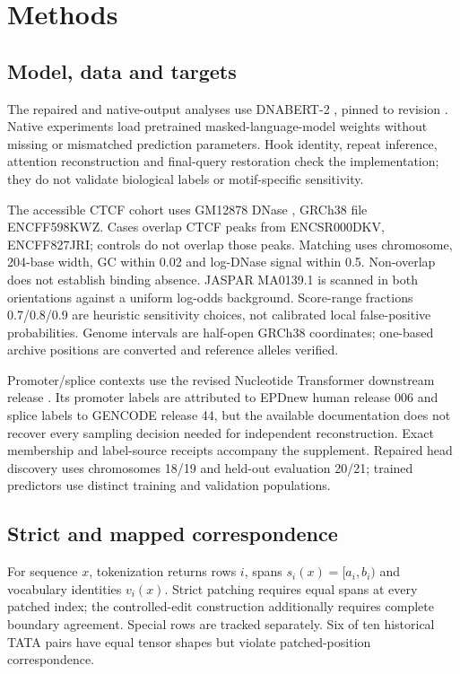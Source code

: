 \documentclass[unnumsec,webpdf,modern,large,namedate]{oup-authoring-template}
\begin{document}
\section{Methods}
\subsection{Model, data and targets}
The repaired and native-output analyses use DNABERT-2 \citep{zhou2024dnabert2}, pinned to revision . Native experiments load pretrained masked-language-model weights without missing or mismatched prediction parameters. Hook identity, repeat inference, attention reconstruction and final-query restoration check the implementation; they do not validate biological labels or motif-specific sensitivity.

The accessible CTCF cohort uses GM12878 DNase , GRCh38 file ENCFF598KWZ. Cases overlap CTCF peaks from ENCSR000DKV, ENCFF827JRI; controls do not overlap those peaks. Matching uses chromosome, 204-base width, GC within 0.02 and log-DNase signal within 0.5. Non-overlap does not establish binding absence. JASPAR MA0139.1 is scanned in both orientations against a uniform log-odds background. Score-range fractions 0.7/0.8/0.9 are heuristic sensitivity choices, not calibrated local false-positive probabilities. Genome intervals are half-open GRCh38 coordinates; one-based archive positions are converted and reference alleles verified.

Promoter/splice contexts use the revised Nucleotide Transformer downstream release . Its promoter labels are attributed to EPDnew human release 006 and splice labels to GENCODE release 44, but the available documentation does not recover every sampling decision needed for independent reconstruction. Exact membership and label-source receipts accompany the supplement. Repaired head discovery uses chromosomes 18/19 and held-out evaluation 20/21; trained predictors use distinct training and validation populations.
\subsection{Strict and mapped correspondence}
For sequence $x$, tokenization returns rows $i$, spans $s_i(x)=[a_i,b_i)$ and vocabulary identities $v_i(x)$. Strict patching requires equal spans at every patched index; the controlled-edit construction additionally requires complete boundary agreement. Special rows are tracked separately. Six of ten historical TATA pairs have equal tensor shapes but violate patched-position correspondence.
\end{document}
